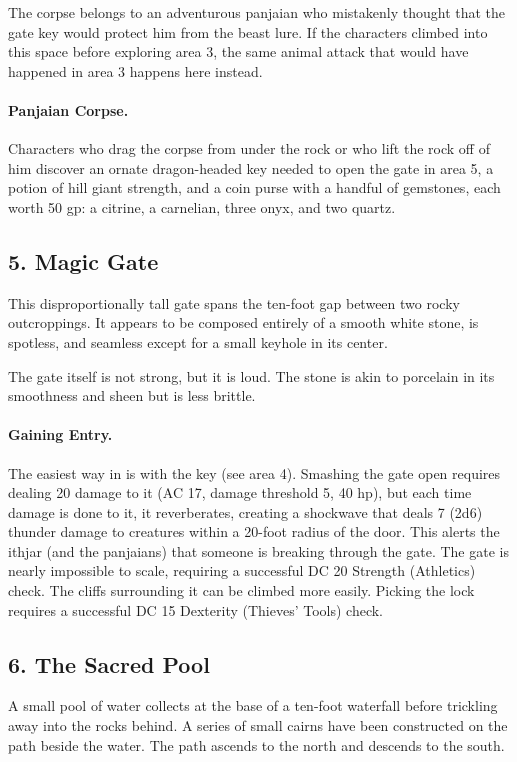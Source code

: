 \documentclass[10pt,a4paper,twoside,twocolumn,openany,bg=print,nodeprecatedcode]{dndbook}
\begin{document}
The corpse belongs to an adventurous panjaian who mistakenly thought that the gate key would protect him from the beast lure. If the characters climbed into this space before exploring area 3, the same animal attack that would have happened in area 3 happens here instead.
\paragraph{Panjaian Corpse.}
Characters who drag the corpse from under the rock or who lift the rock off of him discover an ornate dragon-headed key needed to open the gate in area 5, a potion of hill giant strength, and a coin purse with a handful of gemstones, each worth 50 gp: a citrine, a carnelian, three onyx, and two quartz.
\subsection{5. Magic Gate}
\begin{DndReadAloud}{}
This disproportionally tall gate spans the ten-foot gap between two rocky outcroppings. It appears to be composed entirely of a smooth white stone, is spotless, and seamless except for a small keyhole in its center.
\end{DndReadAloud}

The gate itself is not strong, but it is loud. The stone is akin to porcelain in its smoothness and sheen but is less brittle.
\paragraph{Gaining Entry.}
The easiest way in is with the key (see area 4). Smashing the gate open requires dealing 20 damage to it (AC 17, damage threshold 5, 40 hp), but each time damage is done to it, it reverberates, creating a shockwave that deals 7 (2d6) thunder damage to creatures within a 20-foot radius of the door. This alerts the ithjar (and the panjaians) that someone is breaking through the gate. The gate is nearly impossible to scale, requiring a successful DC 20 Strength (Athletics) check. The cliffs surrounding it can be climbed more easily. Picking the lock requires a successful DC 15 Dexterity (Thieves' Tools) check.
\subsection{6. The Sacred Pool}
\begin{DndReadAloud}{}
A small pool of water collects at the base of a ten-foot waterfall before trickling away into the rocks behind. A series of small cairns have been constructed on the path beside the water. The path ascends to the north and descends to the south.
\end{DndReadAloud}
\end{document}
